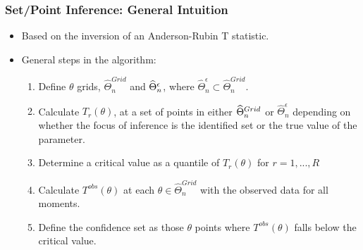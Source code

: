 \documentclass[10pt,letterpaper]{beamer}
\begin{document}
\begin{frame}
\frametitle{Set/Point Inference: General Intuition}

\begin{itemize}
\item Based on the inversion of an Anderson-Rubin T statistic. 

\item General steps in the algorithm: 

\begin{enumerate}
\item Define $\theta $ grids, $\widehat{\Theta }_{n}^{Grid}$ and $\widehat{%
\Theta }_{n}^{\epsilon }$, where $\widehat{\Theta }_{n}^{\epsilon }\subset 
\widehat{\Theta }_{n}^{Grid}$. 

\item Calculate $T_{r}(\theta )$, at a set of points in either $\widehat{%
\Theta }_{n}^{Grid}$ or $\widehat{\Theta }_{n}^{\epsilon }$ depending on
whether the focus of inference is the identified set or the true value of
the parameter. 

\item Determine a critical value as a quantile of $T_{r}(\theta)$ for $%
r=1,...,R$ 

\item Calculate $T^{obs}(\theta )$ at each $\theta \in \widehat{\Theta }%
_{n}^{Grid}$ with the observed data for all moments. 

\item Define the confidence set as those $\theta$ points where $%
T^{obs}(\theta)$ falls below the critical value. 
\end{enumerate}
\end{itemize}
\end{frame}

\end{document}
